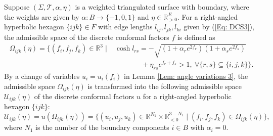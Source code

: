 \documentclass[12pt]{amsart}
\theoremstyle{definition}
\begin{document}
Suppose $(\Sigma,\mathcal{T},\alpha,\eta)$ is a weighted triangulated surface with boundary, 
where the weights are given by $\alpha: B\rightarrow \{-1,0,1\}$ and $\eta\in \mathbb{R}^E_{>0}$.
For a right-angled hyperbolic hexagon $\{ijk\}\in F$ with edge lengths $l_{ij}, l_{jk}, l_{ki}$ given by (\ref{Eq: DCS3}), 
the admissible space of the discrete conformal factors $f$ is defined as
\begin{equation}\label{Eq: admissible space a1}
\begin{aligned}
\Omega_{ijk}(\eta)=\{(f_i,f_j,f_k)\in \mathbb{R}^3\mid &\cosh l_{rs}=-\sqrt{(1+\alpha_re^{2f_r})(1+\alpha_se^{2f_s})}\\
& \ \ \ \ \ \ \ \ \ \ \ \ \ \ \ \ \
+\eta_{rs}e^{f_r+f_s}>1,\  \forall\{r,s\}\subseteq\{i,j,k\}\}.
\end{aligned}
\end{equation}
By a change of variables $u_i=u_i(f_i)$ in Lemma \ref{Lem: angle variations 3},
the admissible space $\Omega_{ijk}(\eta)$ is transformed into the following admissible space $\mathcal{U}_{ijk}(\eta)$ of the discrete conformal factors $u$ for a right-angled hyperbolic hexagon $\{ijk\}$:
\begin{equation*}
\mathcal{U}_{ijk}(\eta)=u(\Omega_{ijk}(\eta))
=\{(u_i,u_j,u_k)\in \mathbb{R}^{N_1}\times \mathbb{R}_{<0}^{3-N_1}\mid (f_i,f_j,f_k)\in \Omega_{ijk}(\eta)\},
\end{equation*}
where $N_1$ is the number of the boundary components $i\in B$ with $\alpha_i=0$.
\end{document}
